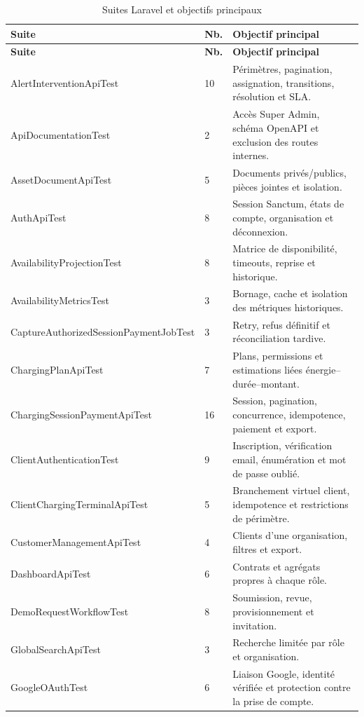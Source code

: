 \small
\begin{longtable}{|L{5.6cm}|C{1.4cm}|L{8.0cm}|}
\caption{Suites Laravel et objectifs principaux}\label{tab:suites-backend}\\
\hline
{}\textbf{Suite} & \textbf{Nb.} & \textbf{Objectif principal} \\ \hline
\endfirsthead
\hline
{}\textbf{Suite} & \textbf{Nb.} & \textbf{Objectif principal} \\ \hline
\endhead
AlertInterventionApiTest & 10 & Périmètres, pagination, assignation, transitions, résolution et SLA. \\ \hline
ApiDocumentationTest & 2 & Accès Super Admin, schéma OpenAPI et exclusion des routes internes. \\ \hline
AssetDocumentApiTest & 5 & Documents privés/publics, pièces jointes et isolation. \\ \hline
AuthApiTest & 8 & Session Sanctum, états de compte, organisation et déconnexion. \\ \hline
AvailabilityProjectionTest & 8 & Matrice de disponibilité, timeouts, reprise et historique. \\ \hline
AvailabilityMetricsTest & 3 & Bornage, cache et isolation des métriques historiques. \\ \hline
CaptureAuthorizedSession\allowbreak PaymentJobTest & 3 & Retry, refus définitif et réconciliation tardive. \\ \hline
ChargingPlanApiTest & 7 & Plans, permissions et estimations liées énergie--durée--montant. \\ \hline
ChargingSessionPaymentApiTest & 16 & Session, pagination, concurrence, idempotence, paiement et export. \\ \hline
ClientAuthenticationTest & 9 & Inscription, vérification email, énumération et mot de passe oublié. \\ \hline
ClientChargingTerminalApiTest & 5 & Branchement virtuel client, idempotence et restrictions de périmètre. \\ \hline
CustomerManagementApiTest & 4 & Clients d'une organisation, filtres et export. \\ \hline
DashboardApiTest & 6 & Contrats et agrégats propres à chaque rôle. \\ \hline
DemoRequestWorkflowTest & 8 & Soumission, revue, provisionnement et invitation. \\ \hline
GlobalSearchApiTest & 3 & Recherche limitée par rôle et organisation. \\ \hline
GoogleOAuthTest & 6 & Liaison Google, identité vérifiée et protection contre la prise de compte. \\ \hline

\end{longtable}
